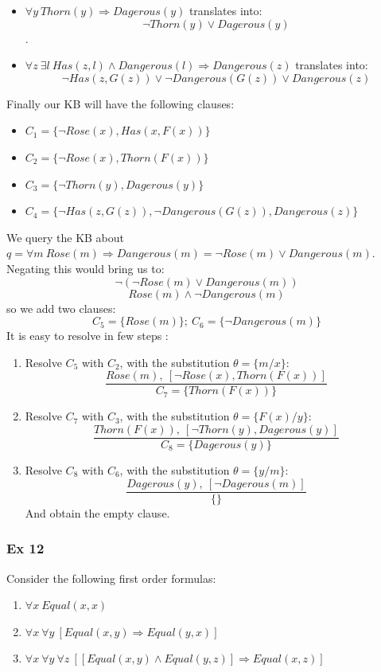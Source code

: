 \documentclass[10pt,a4paper]{article}
\begin{document}
\begin{enumerate}
\begin{itemize}
\begin{itemize}
\end{itemize}
\item $\forall y\ Thorn(y) \Rightarrow Dagerous(y)$ translates into:
\[\neg Thorn(y) \vee Dagerous(y)\].
\item $\forall z\ \exists l\ Has(z,l)\wedge Dangerous(l) \Rightarrow Dangerous(z)$ translates into:
\[\neg Has(z,G(z))\vee \neg Dangerous(G(z)) \vee Dangerous(z)\]

\end{itemize}

Finally our KB will have the following clauses:
\begin{itemize}
\item $C_1=\lbrace \neg Rose(x) , Has(x,F(x))\rbrace$
\item $C_2=\lbrace \neg Rose(x) , Thorn(F(x)) \rbrace$
\item $C_3=\lbrace \neg Thorn(y), Dagerous(y) \rbrace$
\item $C_4=\lbrace \neg Has(z,G(z)), \neg Dangerous(G(z)) , Dangerous(z) \rbrace$
\end{itemize}
We query the KB about $q=\forall m\ Rose(m) \Rightarrow Dangerous(m)=\neg Rose(m) \vee Dangerous(m)$. Negating this would bring us to:
\[\neg (\neg Rose(m) \vee Dangerous(m))\]
\[  Rose(m) \wedge \neg Dangerous(m)\]
 so we add two clauses:
\[C_5=\lbrace  Rose(m)\rbrace;\ C_6=\lbrace \neg  Dangerous(m)\rbrace\]
It is easy to resolve in few steps :
\begin{enumerate}
\item Resolve $C_5$ with $C_2$, with the substitution $\theta=\lbrace m/x \rbrace$:
\[\frac{Rose(m),\ [\neg Rose(x),Thorn(F(x))]}{C_7=\lbrace Thorn(F(x)) \rbrace}\]
\item Resolve $C_7$ with $C_3$, with the substitution $\theta=\lbrace F(x)/y \rbrace$:
\[\frac{Thorn(F(x)),\ [\neg Thorn(y), Dagerous(y)]}{C_8=\lbrace Dagerous(y) \rbrace}\]
\item Resolve $C_8$ with $C_6$, with the substitution $\theta=\lbrace y/m \rbrace$:
\[\frac{Dagerous(y) ,\ [\neg Dagerous(m) ]}{\lbrace \rbrace}\]
And obtain the empty clause.
\end{enumerate}

\subsubsection{Ex 12}
Consider the following first order formulas:
\begin{enumerate}
\item $\forall x\ Equal(x,x)$
\item $\forall x\ \forall y\ [Equal(x,y) \Rightarrow Equal(y,x)]$
\item $\forall x\ \forall y\ \forall z\ [[Equal(x,y)\wedge Equal(y,z)]\Rightarrow Equal(x,z)]$
\end{enumerate}


\end{enumerate}
\end{document}
